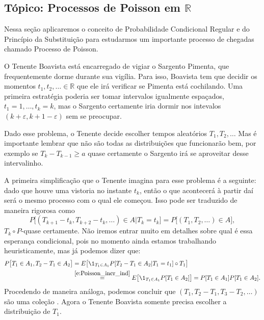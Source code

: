 \documentclass[../Notas_de_aula.tex]{subfiles}
\begin{document}
\begin{topics}

\section{Tópico: Processos de Poisson em \texorpdfstring{$\mathbb{R}$}{R}}

Nessa seção aplicaremos o conceito de Probabilidade Condicional Regular e do Princípio da Substituição  para estudarmos um importante processo de chegadas chamado Processo de Poisson. 

O Tenente Boavista está encarregado de vigiar o Sargento Pimenta, que frequentemente dorme durante sua vigília.
Para isso, Boavista tem que decidir os momentos $t_1, t_2, \dots \in \mathbb{R}$ que ele irá verificar se Pimenta está cochilando.
Uma primeira estratégia poderia ser tomar intervalos igualmente espaçados, $t_1 = 1, \dots, t_k = k$, mas o Sargento certamente iria dormir nos intevalos $(k + \varepsilon, k + 1 - \varepsilon)$ sem se preocupar.

Dado esse problema, o Tenente decide escolher tempos aleatórios $T_1, T_2, \dots$
Mas é importante lembrar que não são todas as distribuições que funcionarão bem, por exemplo se $T_k - T_{k-1} \geq a$ quase certamente o Sargento irá se aproveitar desse intervalinho.

A primeira simplificação que o Tenente imagina para esse problema é a seguinte: dado que houve uma vistoria no instante $t_k$, então o que acontecerá à partir daí será o mesmo processo com o qual ele começou.
Isso pode ser traduzido de maneira rigorosa como
\begin{equation}
  \label{e:Poisson_incr_ind}
  P\big[ (T_{k+1} - t_k, T_{k+2} - t_k, \dots ) \in A | T_k = t_k \big] = P\big[ (T_1, T_2, \dots ) \in A \big],
\end{equation}
$T_k \circ P$-quase certamente.
Não iremos entrar muito em detalhes sobre qual é essa esperança condicional, pois no momento ainda estamos trabalhando heuristicamente, mas já podemos dizer que:
\begin{equation}
  \label{e:increm_poisson}
  \begin{split}
    P\big[ T_1 \in A_1, T_2 - T_1 \in A_2 \big] & = E\big[ \1_{T_1 \in A_1} P[T_2 - T_1 \in A_2 | T_1 = t_1] \circ T_1 \big]\\
    & \overset{\eqref{e:Poisson_incr_ind}}= E\big[ \1_{T_1 \in A_1} P[T_1 \in A_2] \big] = P[T_1 \in A_1] P[T_1 \in A_2].
  \end{split}
\end{equation}
Procedendo de maneira análoga, podemos concluir que $(T_1, T_2 - T_1, T_3 - T_2, \dots)$ são uma coleção \iid.
Agora o Tenente Boavista somente precisa escolher a distribuição de $T_1$.


\end{topics}
\end{document}

